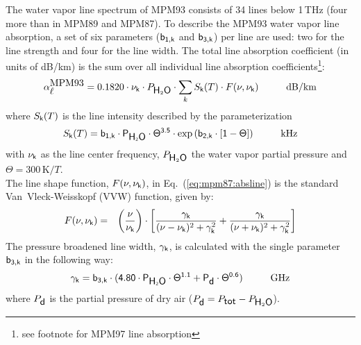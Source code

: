 {
\label{levele:mpm93_h2olines}
The water vapor line spectrum of MPM93 \cite{liebeetal:93} 
consists of 34 lines below 1\,THz (four more than in MPM89 and MPM87). 
To describe the MPM93 water vapor line absorption, a set of six parameters 
($\sf b_{\sf 1,k}$ and $\sf b_{\sf 3,k}$) per line are used: two for the line strength and 
four for the line width. The total line absorption coefficient 
(in units of dB/km) is the sum over all individual line absorption 
coefficients\footnote{see footnote for MPM97 line absorption}:
\begin{equation}
  \label{eq:mpm93:absline}
  \alphampmnl = 0.1820 \cdot \nuk \cdot \phzo \cdot 
  \sum_{k}{\inten \cdot \shape}\hspace*{10mm}\mbox{dB/km}
\end{equation}
where $S_{\sf k}(T)$ is the line intensity described by the parameterization
\begin{equation}
  \label{eq:mpm93:strength}
  \inten = \bek \cdot \phzo \cdot \Theta^{3.5} 
           \cdot \exp{(\bzk \cdot [1-\Theta])}\hspace*{10mm}\mbox{kHz}
\end{equation}
with $\nu_{\sf k}$ as the line center frequency, $P_{\mbox{\sf H}_{2}\mbox{\sf O}}$ the water
vapor partial pressure and $\Theta = 300\,\mbox{K}/T$.\\
The line shape function, $F(\nu,\nu_{\sf k})$, in Eq.~(\ref{eq:mpm87:absline}) 
is the standard Van~Vleck-Weisskopf (VVW) function, given by:
\begin{eqnarray}
  \label{eq:mpm93:VVW}
  F(\nu,\nu_{\sf k}) & = & \left(\frac{\nu}{\nu_{\sf k}}\right) \cdot 
               \left[\frac{\gamma_{\sf k}}{(\nu - \nu_{\sf k})^2 + \gamma_{\sf k}^2} + 
                     \frac{\gamma_{\sf k}}{(\nu + \nu_{\sf k})^2 + \gamma_{\sf k}^2}\right]\\
\end{eqnarray}
The pressure broadened line width, $\gamma_{\sf k}$, is calculated with the 
single parameter $\sf b_{\sf 3,k}$ in the following way:
\begin{equation}
  \label{eq:mpm93:gamma}
  \gamk = \bdk \cdot 
          (4.80 \cdot \phzo \cdot \Theta^{1.1} + \pda \cdot
          \Theta^{0.6})\hspace*{10mm}\mbox{GHz}
\end{equation}
where $P_{\mbox{\sf d}}$ is the partial pressure of dry air ($P_{\mbox{\sf d}}=P_{\mbox{\sf tot}}-P_{\mbox{\sf H}_{2}\mbox{\sf O}}$). 

}
